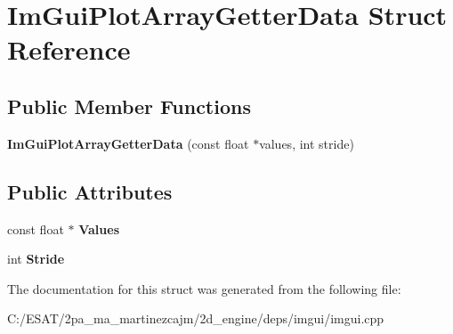 \hypertarget{struct_im_gui_plot_array_getter_data}{}\section{Im\+Gui\+Plot\+Array\+Getter\+Data Struct Reference}
\label{struct_im_gui_plot_array_getter_data}
\subsection*{Public Member Functions}
\begin{DoxyCompactItemize}
\item 
\mbox{\label{struct_im_gui_plot_array_getter_data_a9c4037621f1c247957c04dc8ae1f2903}} 
{\bfseries Im\+Gui\+Plot\+Array\+Getter\+Data} (const float $\ast$values, int stride)
\end{DoxyCompactItemize}
\subsection*{Public Attributes}
\begin{DoxyCompactItemize}
\item 
\mbox{\label{struct_im_gui_plot_array_getter_data_aa40ff2e945549744fc622891089ae0fd}} 
const float $\ast$ {\bfseries Values}
\item 
\mbox{\label{struct_im_gui_plot_array_getter_data_aecb2cce4ea91d95ec81937de656cfcd6}} 
int {\bfseries Stride}
\end{DoxyCompactItemize}


The documentation for this struct was generated from the following file\+:\begin{DoxyCompactItemize}
\item 
C\+:/\+E\+S\+A\+T/2pa\+\_\+ma\+\_\+martinezcajm/2d\+\_\+engine/deps/imgui/imgui.\+cpp\end{DoxyCompactItemize}
